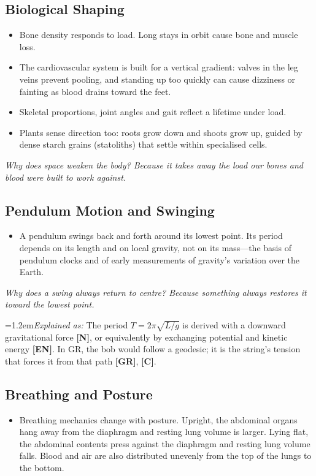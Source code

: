 \documentclass[11pt,a4paper]{article}
\newcommand{\reg}[1]{\textsf{\small\textbf{[#1]}}}
\newcommand{\RN}{\reg{N}}
\newcommand{\RGR}{\reg{GR}}
\newcommand{\RC}{\reg{C}}
\newcommand{\REN}{\reg{EN}}
\newcommand{\expl}[1]{\par\begingroup\leftskip=1.2em\small\noindent\textit{Explained as:} #1\par\endgroup\smallskip}%
\newcommand{\why}[1]{\par\textit{#1}\par}
\begin{document}
\subsection{Biological Shaping}

\begin{itemize}
  \item Bone density responds to load. Long stays in orbit cause bone and muscle loss.
  \item The cardiovascular system is built for a vertical gradient: valves in the leg veins prevent pooling, and standing up too quickly can cause dizziness or fainting as blood drains toward the feet.
  \item Skeletal proportions, joint angles and gait reflect a lifetime under load.
  \item Plants sense direction too: roots grow down and shoots grow up, guided by dense starch grains (statoliths) that settle within specialised cells.
\end{itemize}

\why{Why does space weaken the body? Because it takes away the load our bones and blood were built to work against.}

\subsection{Pendulum Motion and Swinging}

\begin{itemize}
  \item A pendulum swings back and forth around its lowest point. Its period depends on its length and on local gravity, not on its mass---the basis of pendulum clocks and of early measurements of gravity's variation over the Earth.
\end{itemize}

\why{Why does a swing always return to centre? Because something always restores it toward the lowest point.}

\expl{The period $T = 2\pi\sqrt{L/g}$ is derived with a downward gravitational force \RN{}, or equivalently by exchanging potential and kinetic energy \REN{}. In GR, the bob would follow a geodesic; it is the string's tension that forces it from that path \RGR{}, \RC{}.}

\subsection{Breathing and Posture}

\begin{itemize}
  \item Breathing mechanics change with posture. Upright, the abdominal organs hang away from the diaphragm and resting lung volume is larger. Lying flat, the abdominal contents press against the diaphragm and resting lung volume falls. Blood and air are also distributed unevenly from the top of the lungs to the bottom.
\end{itemize}
\end{document}
